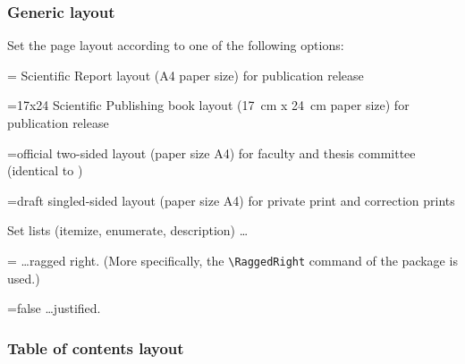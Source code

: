 \subsubsection{Generic layout}
\label{sec:generic-layout}

\begin{optionlist}
   \opt[layout] Set the  page layout according to one of the following options:
   \begin{valuelist}
      \item[=\optionvaluedefaultfont{report}] \KIT Scientific Report layout (A4 paper size) for publication release
      \item[=17x24] \KIT Scientific Publishing book layout (\SI{17}{\centi\meter} x \SI{24}{\centi\meter} paper size) for publication release
      \item[=official] two-sided layout (paper size A4) for faculty and thesis committee (identical to )
      \item[=draft] singled-sided layout (paper size A4) for private print and correction prints
   \end{valuelist}
   
   \opt[raggedlists] Set lists (itemize, enumerate, description) \dots
   \begin{valuelist}
      \item[=\optionvaluedefaultfont{true}] \dots ragged right. (More specifically, the \lstinline|\RaggedRight| command of the  package is used.)
      \item[=false] \dots justified.
   \end{valuelist}
\end{optionlist}

\subsubsection{Table of contents layout}
\label{sec:toc-layout}
   

